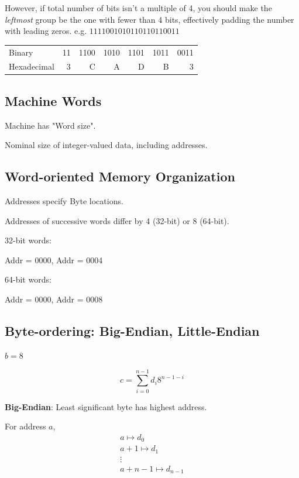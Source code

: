 \documentclass[10pt]{amsart}
\begin{document}
\begin{multicols*}{2}
However, if total number of bits isn't a multiple of 4, you should make the \emph{leftmost} group be the one with fewer than 4 bits, effectively padding the number with leading zeros. e.g. $1111001010110110110011$

\begin{center}
	\begin{tabular}{ l | r | r | r | r | r | r }
		Binary & 11 & 1100 & 1010 & 1101 & 1011 & 0011 \\
		Hexadecimal & 3 & C & A & D & B & 3 \\
	\end{tabular}
\end{center}


\subsection{Machine Words}

Machine has "Word size".

Nominal size of integer-valued data, including addresses.

\subsection{Word-oriented Memory Organization}

Addresses specify Byte locations. 

Addresses of successive words differ by 4 (32-bit) or 8 (64-bit).

32-bit words:

Addr = 0000, Addr = 0004

64-bit words:

Addr = 0000, Addr = 0008

\subsection{Byte-ordering: Big-Endian, Little-Endian}

$b = 8$

\begin{equation}
c = \sum_{i=0}^{n-1} d_i 8^{n-1 -i}
\end{equation}

\textbf{Big-Endian}: Least significant byte has highest address.

For address $a$, 
\[
\begin{gathered}
	a \mapsto d_0 \\
	a+1 \mapsto d_1 \\
\vdots \\
a+n-1 \mapsto d_{n-1}
\end{gathered}
\]


\end{multicols*}
\end{document}

